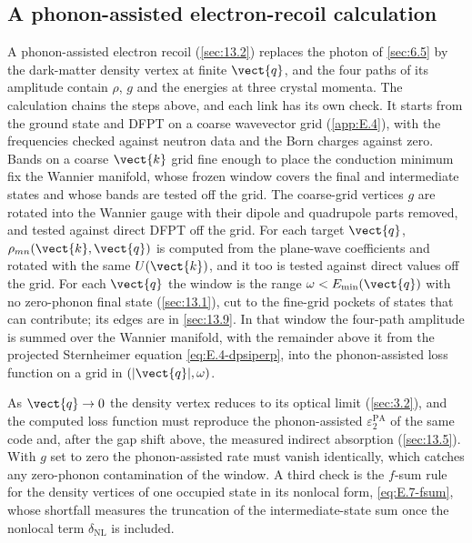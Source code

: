 \subsection{A phonon-assisted electron-recoil calculation}

A phonon-assisted electron recoil (\cref{sec:13.2}) replaces the photon of \cref{sec:6.5} by the dark-matter density vertex at finite $\vect{q}$, and the four paths of its amplitude contain $\rho$, $g$ and the energies at three crystal momenta. The calculation chains the steps above, and each link has its own check. It starts from the ground state and DFPT on a coarse wavevector grid (\cref{app:E.4}), with the frequencies checked against neutron data and the Born charges against zero. Bands on a coarse $\vect{k}$ grid fine enough to place the conduction minimum fix the Wannier manifold, whose frozen window covers the final and intermediate states and whose bands are tested off the grid. The coarse-grid vertices $g$ are rotated into the Wannier gauge with their dipole and quadrupole parts removed, and tested against direct DFPT off the grid. For each target $\vect{q}$, $\rho_{mn}(\vect{k},\vect{q})$ is computed from the plane-wave coefficients and rotated with the same $U(\vect{k})$, and it too is tested against direct values off the grid. For each $\vect{q}$ the window is the range $\omega < E_{\mathrm{min}}(\vect{q})$ with no zero-phonon final state (\cref{sec:13.1}), cut to the fine-grid pockets of states that can contribute; its edges are in \cref{sec:13.9}. In that window the four-path amplitude is summed over the Wannier manifold, with the remainder above it from the projected Sternheimer equation \cref{eq:E.4-dpsiperp}, into the phonon-assisted loss function on a grid in $(|\vect{q}|,\omega)$.

As $\vect{q}\to0$ the density vertex reduces to its optical limit (\cref{sec:3.2}), and the computed loss function must reproduce the phonon-assisted $\varepsilon_2^{\mathrm{PA}}$ of the same code and, after the gap shift above, the measured indirect absorption (\cref{sec:13.5}). With $g$ set to zero the phonon-assisted rate must vanish identically, which catches any zero-phonon contamination of the window. A third check is the $f$-sum rule for the density vertices of one occupied state in its nonlocal form, \cref{eq:E.7-fsum}, whose shortfall measures the truncation of the intermediate-state sum once the nonlocal term $\delta_{\mathrm{NL}}$ is included.

